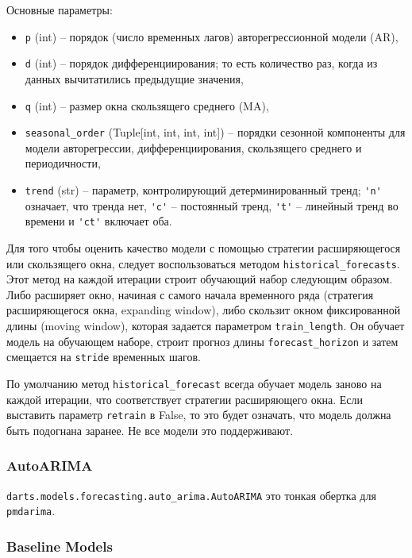 \documentclass[%
	11pt,
	a4paper,
	utf8,
		]{article}
\begin{document}
Основные параметры:
\begin{itemize}
	\item \verb|p| (int) -- порядок (число временных лагов) авторегрессионной модели (AR),
	
	\item \verb|d| (int) -- порядок дифференциирования; то есть количество раз, когда из данных вычитатились предыдущие значения,
	
	\item \verb|q| (int) -- размер окна скользящего среднего (MA),
	
	\item \verb|seasonal_order| (Tuple[int, int, int, int]) -- порядки сезонной компоненты для модели авторегрессии, дифференциирования, скользящего среднего и периодичности,
	
	\item \verb|trend| (str) -- параметр, контролирующий детерминированный тренд; \verb|'n'| означает, что тренда нет, \verb|'c'| -- постоянный тренд, \verb|'t'| -- линейный тренд во времени и \verb|'ct'| включает оба.
\end{itemize}

Для того чтобы оценить качество модели с помощью стратегии расширяющегося или скользящего окна, следует воспользоваться методом \verb|historical_forecasts|. Этот метод на каждой итерации строит обучающий набор следующим образом. Либо расширяет окно, начиная с самого начала временного ряда (стратегия расширяющегося окна, expanding window), либо скользит окном фиксированной длины (moving window), которая задается параметром \verb|train_length|. Он обучает модель на обучающем наборе, строит прогноз длины \verb|forecast_horizon| и затем смещается на \verb|stride| временных шагов.

По умолчанию метод \verb|historical_forecast| всегда обучает модель заново на каждой итерации, что соответствует стратегии расширяющего окна. Если выставить параметр \verb|retrain| в False, то это будет означать, что модель должна быть подогнана заранее. Не все модели это поддерживают.

\subsubsection{AutoARIMA}

\verb|darts.models.forecasting.auto_arima.AutoARIMA| это тонкая обертка для \verb|pmdarima|.

\subsubsection{Baseline Models}
\end{document}
